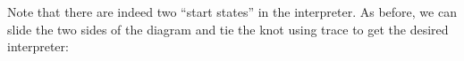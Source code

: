 \documentclass{llncs}
\begin{document}
Note that there are indeed two ``start states'' in the interpreter. As before, we can
slide the two sides of the diagram and tie the knot using {{trace}} to
get the desired interpreter:

\begin{center}
\end{center}










\end{document}
